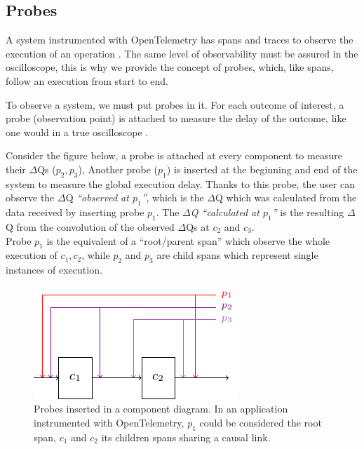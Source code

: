 \subsection{Probes}

A system instrumented with OpenTelemetry has spans and traces to observe the execution of an operation \cite{otel-t}. The same level of observability must be assured in the oscilloscope, this is why we provide the concept of probes, which, like spans, follow an execution from start to end.

To observe a system, we must put probes in it. For each outcome of interest, a probe (observation point) is attached to measure the delay of the outcome, like one would in a true oscilloscope \cite{post}.

Consider the figure below, a probe is attached at every component to measure their $\Delta$Qs ($p_2, p_3$),  Another probe ($p_1$) is inserted at the beginning and end of the system to measure the global execution delay. Thanks to this probe, the user can observe the $\Delta$Q \textit{``observed at $p_1$''}, which is the $\Delta$Q which was calculated from the data received by inserting probe $p_1$. The \textit{$\Delta$Q ``calculated at $p_1$''} is the resulting $\Delta$Q from the convolution of the observed $\Delta$Qs at $c_2$ and $c_3$. \\
Probe $p_1$ is the equivalent of a ``root/parent span'' which observe the whole execution of $c_1, c_2$, while $p_2$ and $p_3$ are child spans which represent single instances of execution.

    \begin{figure}[H]
        \begin{center}
            \includegraphics[scale=1.8]{tikz/probes.pdf}
        \end{center}
        \caption{Probes inserted in a component diagram. In an application instrumented with OpenTelemetry, $p_1$ could be considered the root span, $c_1$ and $c_2$ its children spans sharing a causal link.}
        \label{fig:probes}
    \end{figure}



